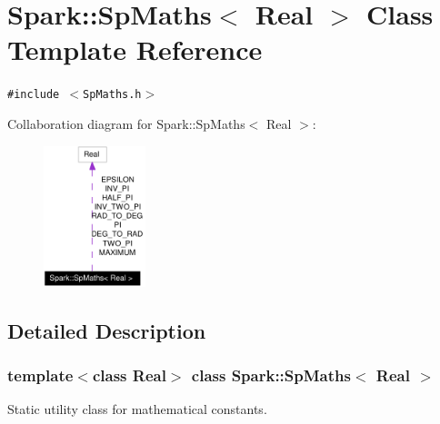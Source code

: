 \section{Spark::Sp\-Maths$<$ Real $>$ Class Template Reference}
\label{classSpark_1_1SpMaths}
{\tt \#include $<$Sp\-Maths.h$>$}

Collaboration diagram for Spark::Sp\-Maths$<$ Real $>$:\begin{figure}[H]
\begin{center}
\leavevmode
\includegraphics[width=84pt]{classSpark_1_1SpMaths__coll__graph}
\end{center}
\end{figure}


\subsection{Detailed Description}
\subsubsection*{template$<$class Real$>$ class Spark::Sp\-Maths$<$ Real $>$}

Static utility class for mathematical constants. 

